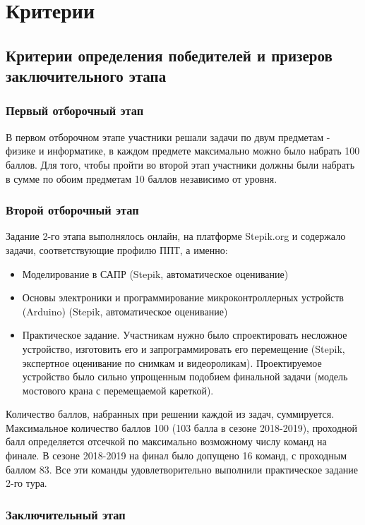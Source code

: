 \part{Критерии}
\chapter{Критерии определения победителей и призеров заключительного этапа}

\section{Первый отборочный этап}
 
В первом отборочном этапе участники решали задачи по двум предметам - физике и информатике, в каждом предмете максимально можно было набрать 100 баллов. Для того, чтобы пройти во второй этап участники должны были набрать в сумме по обоим предметам 10 баллов независимо от уровня.

\section{Второй отборочный этап}

Задание 2-го этапа выполнялось онлайн, на платформе Stepik.org и содержало задачи, соответствующие профилю ППТ, а именно:
\begin{itemize}
    \item Моделирование в САПР (Stepik, автоматическое оценивание)
    \item Основы электроники и программирование микроконтроллерных устройств (Arduino) (Stepik, автоматическое оценивание)
    \item Практическое задание. Участникам нужно было спроектировать несложное устройство, изготовить его и запрограммировать его перемещение (Stepik, экспертное оценивание по снимкам и видеороликам).  Проектируемое устройство было сильно упрощенным подобием финальной задачи (модель мостового крана с перемещаемой кареткой).
\end{itemize}

Количество баллов, набранных при решении каждой из задач, суммируется. Максимальное количество баллов 100  (103  балла в сезоне 2018-2019), проходной балл определяется отсечкой по максимально возможному числу команд на финале. В сезоне 2018-2019 на финал было допущено 16 команд, с проходным баллом 83.  Все эти команды удовлетворительно выполнили практическое задание 2-го тура.


\section{Заключительный этап}

